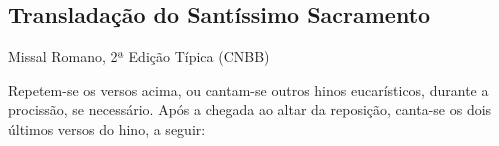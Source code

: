 \subsection{Transladação do Santíssimo Sacramento}\label{subsection:hebdomada-sancta/missa-in-cena-domini/ad-translatione-ssmi-sacramenti}
\begin{annotation}
    Missal Romano, 2ª Edição Típica (CNBB)
\end{annotation}
\begin{rubrica}
    Repetem-se os versos acima, ou cantam-se outros hinos eucarísticos, durante a procissão, se necessário. Após a chegada ao altar da reposição, canta-se os dois últimos versos do hino, a seguir:
\end{rubrica}
